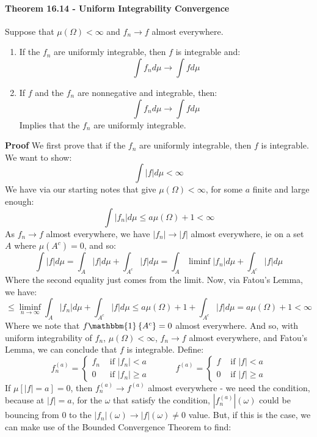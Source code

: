 \documentclass[12pt,a4paper]{article}
\newcommand{\1}[1]{\mathbbm{1}\left\{ #1 \right\}}
\begin{document}
\paragraph{Theorem 16.14 - Uniform Integrability Convergence} Suppose that $\mu(\Omega) < \infty$ and $f_n \to f$ almost everywhere.
\begin{enumerate}
	\item If the $f_n$ are uniformly integrable, then $f$ is integrable and:
	$$
		\int f_n d\mu \to \int f d\mu
	$$
	
	\item If $f$ and the $f_n$ are nonnegative and integrable, then:
	$$
		\int f_n d\mu \to \int f d\mu
	$$
	Implies that the $f_n$ are uniformly integrable.
\end{enumerate}
\textbf{Proof} We first prove that if the $f_n$ are uniformly integrable, then $f$ is integrable. We want to show:
$$
	\int |f| d\mu < \infty
$$
We have via our starting notes that give $\mu(\Omega) < \infty$, for some $a$ finite and large enough:
$$
	\int |f_n| d\mu \leq a\mu(\Omega) + 1 < \infty
$$
As $f_n \to f$ almost everywhere, we have $|f_n| \to |f|$ almost everywhere, ie on a set $A$ where $\mu(A^c) = 0$, and so:
$$
	\int |f| d\mu = \int_A |f| d\mu + \int_{A^c} |f| d\mu =
	\int_A \liminf |f_n| d\mu + \int_{A^c} |f| d\mu
$$
Where the second equality just comes from the limit. Now, via Fatou's Lemma, we have:
$$
	\leq 
	\liminf_{n \to \infty} \int_A |f_n| d\mu + \int_{A^c} |f| d\mu \leq
	a\mu(\Omega) + 1 + \int_{A^c} |f| d\mu =
	a\mu(\Omega) + 1 < \infty
$$
Where we note that $f \1{A^c} = 0$ almost everywhere. And so, with uniform integrability of $f_n$, $\mu(\Omega) < \infty$, $f_n \to f$ almost everywhere, and Fatou's Lemma, we can conclude that $f$ is integrable. Define:
$$
	f_n^{(a)} = 
	\begin{cases}
	f_n & \text{ if $|f_n| < a$}\\
	0 & \text{ if $|f_n| \geq a$}
	\end{cases}
	\quad\quad\quad
	f^{(a)} = 
	\begin{cases}
	f & \text{ if $|f| < a$}\\
	0 & \text{ if $|f| \geq a$}
	\end{cases}
$$
If $\mu[|f| = a] = 0$, then $f_n^{(a)} \to f^{(a)}$ almost everywhere - we need the condition, because at $|f| = a$, for the $\omega$ that satisfy the condition, $|f_n^{(a)}|(\omega)$ could be bouncing from $0$ to the $|f_n|(\omega) \to |f|(\omega) \neq 0$ value. But, if this is the case, we can make use of the Bounded Convergence Theorem to find:
\end{document}

